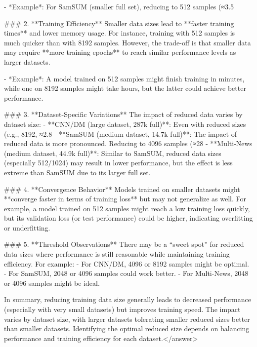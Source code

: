 - *Example*: For SamSUM (smaller full set), reducing to 512 samples (≈3.5%


### 2. **Training Efficiency**  
Smaller data sizes lead to **faster training times** and lower memory usage. For instance, training with 512 samples is much quicker than with 8192 samples. However, the trade-off is that smaller data may require **more training epochs** to reach similar performance levels as larger datasets.  

- *Example*: A model trained on 512 samples might finish training in minutes, while one on 8192 samples might take hours, but the latter could achieve better performance.  


### 3. **Dataset-Specific Variations**  
The impact of reduced data varies by dataset size:  
- **CNN/DM (large dataset, 287k full)**: Even with reduced sizes (e.g., 8192, ≈2.8%
- **SamSUM (medium dataset, 14.7k full)**: The impact of reduced data is more pronounced. Reducing to 4096 samples (≈28%
- **Multi-News (medium dataset, 44.9k full)**: Similar to SamSUM, reduced data sizes (especially 512/1024) may result in lower performance, but the effect is less extreme than SamSUM due to its larger full set.  


### 4. **Convergence Behavior**  
Models trained on smaller datasets might **converge faster in terms of training loss** but may not generalize as well. For example, a model trained on 512 samples might reach a low training loss quickly, but its validation loss (or test performance) could be higher, indicating overfitting or underfitting.  


### 5. **Threshold Observations**  
There may be a “sweet spot” for reduced data sizes where performance is still reasonable while maintaining training efficiency. For example:  
- For CNN/DM, 4096 or 8192 samples might be optimal.  
- For SamSUM, 2048 or 4096 samples could work better.  
- For Multi-News, 2048 or 4096 samples might be ideal.  


In summary, reducing training data size generally leads to decreased performance (especially with very small datasets) but improves training speed. The impact varies by dataset size, with larger datasets tolerating smaller reduced sizes better than smaller datasets. Identifying the optimal reduced size depends on balancing performance and training efficiency for each dataset.</answer>